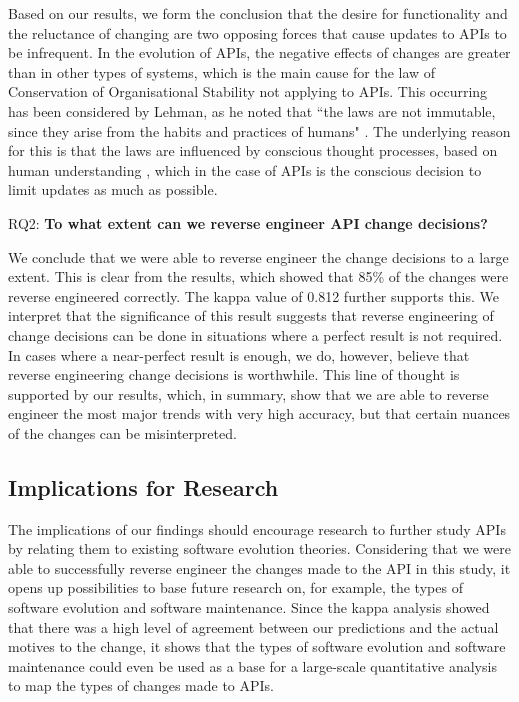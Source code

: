 \documentclass{sig-alternate}
\begin{document}
Based on our results, we form the conclusion that the desire for functionality and the reluctance of changing are two opposing forces that cause updates to APIs to be infrequent. In the evolution of APIs, the negative effects of changes are greater than in other types of systems, which is the main cause for the law of Conservation of Organisational Stability not applying to APIs. This occurring has been considered by Lehman, as he noted that ``the laws are not immutable, since they arise from the habits and practices of humans" \cite{lehman1980programs}. The underlying reason for this is that the laws are influenced by conscious thought processes, based on human understanding \cite{lehman1980understanding}, which in the case of APIs is the conscious decision to limit updates as much as possible. 

\smallskip
\noindent
RQ2: \textbf{To what extent can we reverse engineer API change decisions?}
\smallskip

We conclude that we were able to reverse engineer the change decisions to a large extent. This is clear from the results, which showed that 85\% of the changes were reverse engineered correctly. The kappa value of 0.812 further supports this. We interpret that the significance of this result suggests that reverse engineering of change decisions can be done in situations where a perfect result is not required. In cases where a near-perfect result is enough, we do, however, believe that reverse engineering change decisions is worthwhile. This line of thought is supported by our results, which, in summary, show that we are able to reverse engineer the most major trends with very high accuracy, but that certain nuances of the changes can be misinterpreted. 



\subsection{Implications for Research} 
The implications of our findings should encourage research to further study APIs by relating them to existing software evolution theories. Considering that we were able to successfully reverse engineer the changes made to the API in this study, it opens up possibilities to base future research on, for example, the types of software evolution and software maintenance. Since the kappa analysis showed that there was a high level of agreement between our predictions and the actual motives to the change, it shows that the types of software evolution and software maintenance could even be used as a base for a large-scale quantitative analysis to map the types of changes made to APIs. 
\end{document}

